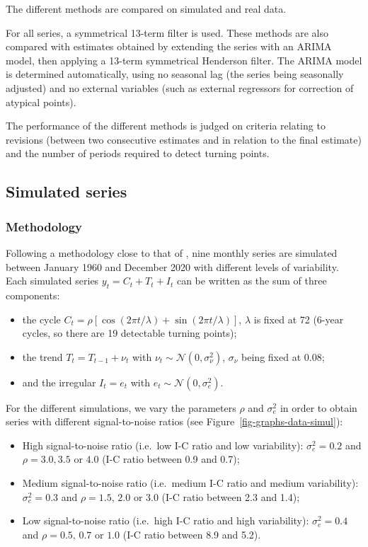 \documentclass[
]{article}
\newcommand\1{\mathds{1}}
\begin{document}
The different methods are compared on simulated and real data.

For all series, a symmetrical 13-term filter is used. These methods are
also compared with estimates obtained by extending the series with an
ARIMA model, then applying a 13-term symmetrical Henderson filter. The
ARIMA model is determined automatically, using no seasonal lag (the
series being seasonally adjusted) and no external variables (such as
external regressors for correction of atypical points).

The performance of the different methods is judged on criteria relating
to revisions (between two consecutive estimates and in relation to the
final estimate) and the number of periods required to detect turning
points.

\hypertarget{simulated-series}{%
\subsection{Simulated series}\label{simulated-series}}

\hypertarget{methodology}{%
\subsubsection{Methodology}\label{methodology}}

Following a methodology close to that of \textcite{DarneDagum2009}, nine
monthly series are simulated between January 1960 and December 2020 with
different levels of variability. Each simulated series
\(y_t= C_t+ T_t + I_t\) can be written as the sum of three components:

\begin{itemize}
\item
  the cycle
  \(C_t = \rho [\cos (2 \pi t / \lambda) +\sin (2 \pi t / \lambda)]\),
  \(\lambda\) is fixed at 72 (6-year cycles, so there are 19 detectable
  turning points);
\item
  the trend \(T_t = T_{t-1} + \nu_t\) with
  \(\nu_t \sim \mathcal{N}(0, \sigma_\nu^2)\), \(\sigma_\nu\) being
  fixed at \(0.08\);
\item
  and the irregular \(I_t = e_t\) with
  \(e_t \sim \mathcal{N}(0, \sigma_e^2)\).
\end{itemize}

For the different simulations, we vary the parameters \(\rho\) and
\(\sigma_e^2\) in order to obtain series with different signal-to-noise
ratios (see Figure~\ref{fig-graphs-data-simul}):

\begin{itemize}
\item
  High signal-to-noise ratio (i.e.~low I-C ratio and low variability):
  \(\sigma_e^2=0.2\) and \(\rho = 3.0, 3.5\) or \(4.0\) (I-C ratio
  between 0.9 and 0.7);
\item
  Medium signal-to-noise ratio (i.e.~medium I-C ratio and medium
  variability): \(\sigma_e^2=0.3\) and \(\rho = 1.5,\, 2.0\) or \(3.0\)
  (I-C ratio between 2.3 and 1.4);
\item
  Low signal-to-noise ratio (i.e.~high I-C ratio and high variability):
  \(\sigma_e^2=0.4\) and \(\rho = 0.5,\, 0.7\) or \(1.0\) (I-C ratio
  between 8.9 and 5.2).
\end{itemize}
\end{document}
